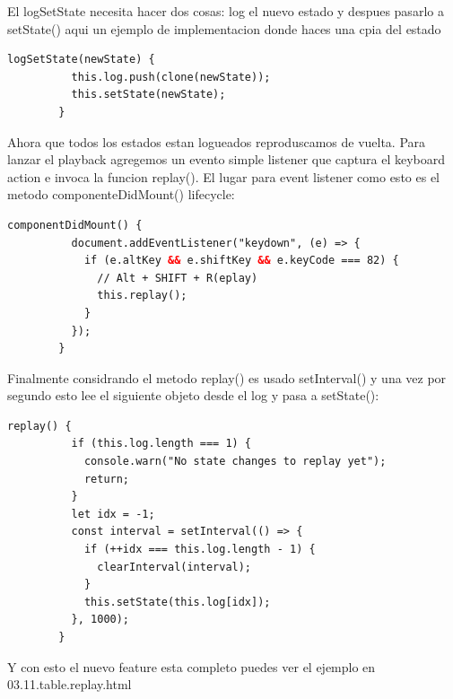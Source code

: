 El logSetState necesita hacer dos cosas: log el nuevo estado y despues pasarlo a setState() aqui un ejemplo de implementacion donde haces una cpia del estado
\begin{lstlisting}[language=html]
        logSetState(newState) {
          this.log.push(clone(newState));
          this.setState(newState);
        }
\end{lstlisting}
Ahora que todos los estados estan logueados reproduscamos de vuelta. Para lanzar el playback agregemos un evento simple listener que captura el keyboard action e invoca la funcion replay(). El lugar para event listener como esto es el metodo componenteDidMount() lifecycle:
\begin{lstlisting}[language=html]
        componentDidMount() {
          document.addEventListener("keydown", (e) => {
            if (e.altKey && e.shiftKey && e.keyCode === 82) {
              // Alt + SHIFT + R(eplay)
              this.replay();
            }
          });
        }
\end{lstlisting}
Finalmente considrando el metodo replay() es usado setInterval() y una vez por segundo esto lee el siguiente objeto desde el log y pasa a setState():
\begin{lstlisting}[language=html]
        replay() {
          if (this.log.length === 1) {
            console.warn("No state changes to replay yet");
            return;
          }
          let idx = -1;
          const interval = setInterval(() => {
            if (++idx === this.log.length - 1) {
              clearInterval(interval);
            }
            this.setState(this.log[idx]);
          }, 1000);
        }
\end{lstlisting}
Y con esto el nuevo feature esta completo puedes ver el ejemplo en 03.11.table.replay.html
